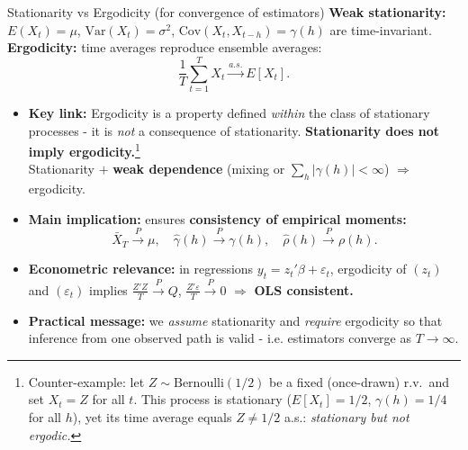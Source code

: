 \documentclass{beamer}
\begin{document}
\begin{frame}{Stationarity vs Ergodicity (for convergence of estimators)}
\footnotesize
\textbf{Weak stationarity:} $E(X_t)=\mu$, $\mathrm{Var}(X_t)=\sigma^2$, $\mathrm{Cov}(X_t,X_{t-h})=\gamma(h)$ are time-invariant.\\
\textbf{Ergodicity:} time averages reproduce ensemble averages:
\[
\frac{1}{T}\sum_{t=1}^T X_t \xrightarrow{a.s.} E[X_t].
\]
\pause

\begin{itemize}
  \item \textbf{Key link:} Ergodicity is a property defined \emph{within} the class of stationary processes - it is \emph{not} a consequence of stationarity.
        \textbf{Stationarity does not imply ergodicity.}\footnote{\tiny Counter-example: let $Z\sim\mathrm{Bernoulli}(1/2)$ be a fixed (once-drawn) r.v.\ and set $X_t=Z$ for all $t$. This process is stationary ($E[X_t]=1/2$, $\gamma(h)=1/4$ for all $h$), yet its time average equals $Z\neq 1/2$ a.s.: \emph{stationary but not ergodic.}}\\
        Stationarity $+$ \textbf{weak dependence} (mixing or $\sum_h |\gamma(h)|<\infty$) $\Rightarrow$ ergodicity.
  \item \textbf{Main implication:} ensures \textbf{consistency of empirical moments:}
\[
  \bar X_T \xrightarrow{P} \mu,\quad 
  \hat\gamma(h) \xrightarrow{P} \gamma(h),\quad 
  \hat\rho(h) \xrightarrow{P} \rho(h).
  \]
  \item \textbf{Econometric relevance:} in regressions $y_t = z_t'\beta + \varepsilon_t$, ergodicity of $(z_t)$ and $(\varepsilon_t)$ implies  $\frac{Z'Z}{T}\xrightarrow{P}Q$, $\frac{Z'\varepsilon}{T}\xrightarrow{P}0$  
        $\Rightarrow$ \textbf{OLS consistent.}
  \item \textbf{Practical message:} we \emph{assume} stationarity and \emph{require} ergodicity so that inference from one observed path is valid -  i.e. estimators converge as $T \to \infty$.
\end{itemize}
\end{frame}




\end{document}
